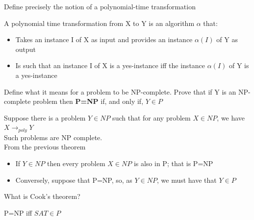 \documentclass[addpoints]{exam}
\begin{document}
\begin{questions}
\question[4]Define precisely the notion of a polynomial-time transformation
\begin{solution}[2in]
	A polynomial time transformation from X to Y is an algorithm $\alpha$ that:
	\begin{itemize}
		\item Takes an instance I of X as input and provides an instance $\alpha(I)$ of Y as output
		\item Is such that an instance I of X is a yes-instance iff the instance $\alpha(I)$ of Y is a yes-instance
	\end{itemize}
\end{solution}

\question[6]Define what it means for a problem to be NP-complete. Prove that if Y is an NP-complete problem then \textbf{P=NP} if, and only if, $Y\in P$
\begin{solution}[2in]
	Suppose there is a problem $Y\in NP$ such that for any problem $X\in NP$, we have $X\rightarrow_{poly} Y$\\
	Such problems are NP complete.\\
	From the previous theorem
	\begin{itemize}
		\item If $Y\in NP$ then every problem $X\in NP$ is also in P; that is P=NP
		\item Conversely, suppose that P=NP, so, as $Y\in NP$, we must have that $Y\in P$
	\end{itemize}
	
\end{solution}


\question[2]What is Cook's theorem?
\begin{solution}[2in]
	P=NP iff $SAT\in P$
\end{solution}


\end{questions}
\end{document}
